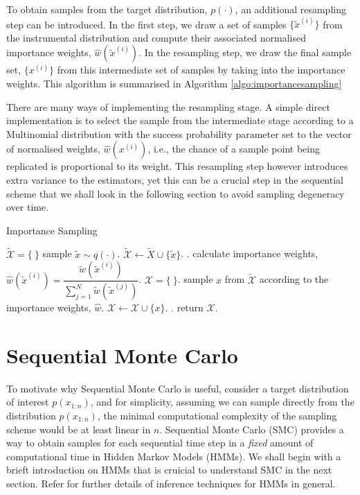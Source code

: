 To obtain samples from the target distribution, $p(\cdot)$, an additional resampling step can be introduced. In the first step, we draw a set of samples $\{\tilde{x}^{(i)}\}$ from the instrumental distribution and compute their associated normalised importance weights, $\hat{w}(\tilde{x}^{(i)})$. In the resampling step, we draw the final sample set, $\{x^{(i)}\}$ from this intermediate set of samples by taking into the importance weights. This algorithm is summarised in Algorithm \ref{algo:importancesampling}

There are many ways of implementing the resampling stage. A simple direct implementation is to select the sample from the intermediate stage according to a Multinomial distribution with the success probability parameter set to the vector of normalised weights, $\hat{w}(x^{(i)})$, i.e., the chance of a sample point being replicated is proportional to its weight. This resampling step however introduces extra variance to the estimators, yet this can be a crucial step in the sequential scheme that we shall look in the following section to avoid sampling degeneracy over time.

\begin{algorithm}
\caption{Importance Sampling}\label{algo:importancesampling}
\begin{algorithmic}[1]
\State $\tilde{\mathcal{X}} = \{\ \}$
\Repeat
  \State sample $\tilde{x} \sim q(\cdot)$.
  \State $\tilde{\mathcal{X}} \gets \tilde{X} \cup \{\tilde{x}\}$.
.
\State calculate importance weights, $\hat{w}(\tilde{x}^{(i)})  = \dfrac{\tilde{w}(\tilde{x}^{(i)})}{\sum^N_{j=1} \tilde{w}(\tilde{x}^{(j)})}$.
\State $\mathcal{X} = \{\ \}$.
\Repeat
  \State sample $x$ from $\tilde{\mathcal{X}}$ according to the importance weights, $\hat{w}$.
  \State $\mathcal{X} \gets \mathcal{X} \cup \{x\}$.
.
\State return $\mathcal{X}$.
\EndFunction
\end{algorithmic}
\end{algorithm}

\section{Sequential Monte Carlo}
\label{sec:SMC}
To motivate why Sequential Monte Carlo is useful, consider a target distribution of interest $p(x_{1:n})$, and for simplicity, assuming we can sample directly from the distribution $p(x_{1:n})$, the minimal computational complexity of the sampling scheme would be at least linear in $n$. Sequential Monte Carlo (SMC) provides a way to obtain samples for each sequential time step in a \emph{fixed} amount of computational time in Hidden Markov Models (HMMs). We shall begin with a brieft introduction on HMMs that is cruicial to understand SMC in the next section. Refer \cite{CO05} for further details of inference techniques for HMMs in general. 

